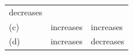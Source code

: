 \begin{enumerate}[noitemsep, label=\textbf{\arabic*}. ]
\begin{enumerate}[noitemsep, label=\textbf{\alph*}. ]
{\begin{tabular}[t]{|l|l|l|}
        decreases%
     \tabularnewline\cline{1-1}\cline{2-2}\cline{3-3}
    
    
        (c) &
    
    
        increases &
    
    
        increases%
     \tabularnewline\cline{1-1}\cline{2-2}\cline{3-3}
    
    
        (d) &
    
    
        increases &
    
    
        decreases%
     \tabularnewline\cline{1-1}\cline{2-2}\cline{3-3}
    \end{tabular}} %
        \addtolength{\mytableboxheight}{\mytableboxdepth}
        \addtocounter{footnote}{-0}
        

\end{enumerate}
\end{enumerate}
